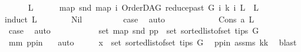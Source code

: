 \begin{isabellebody}
\ \ \ \ \isamarkupfalse%
\ L\isanewline
\ \ \ \ \isamarkupfalse%
\ {\isachardoublequoteopen}map\ snd\ {\isacharparenleft}{\kern0pt}map\ {\isacharparenleft}{\kern0pt}{\isasymlambda}i{\isachardot}{\kern0pt}\ {\isacharparenleft}{\kern0pt}OrderDAG\ {\isacharparenleft}{\kern0pt}reduce{\isacharunderscore}{\kern0pt}past\ G\ i{\isacharparenright}{\kern0pt}\ k{\isacharcomma}{\kern0pt}\ i{\isacharparenright}{\kern0pt}{\isacharparenright}{\kern0pt}\ L{\isacharparenright}{\kern0pt}\ {\isacharequal}{\kern0pt}\ L{\isachardoublequoteclose}\isanewline
\ \ \ \ \isamarkupfalse%
{\isacharparenleft}{\kern0pt}induct\ L{\isacharparenright}{\kern0pt}\isanewline
\ \ \ \ \ \ \isamarkupfalse%
\ Nil\isanewline
\ \ \ \ \ \ \isamarkupfalse%
\ \isamarkupfalse%
\ {\isacharquery}{\kern0pt}case\ \isamarkupfalse%
\ auto\isanewline
\ \ \ \ \isamarkupfalse%
\isanewline
\ \ \ \ \ \ \isamarkupfalse%
\ {\isacharparenleft}{\kern0pt}Cons\ a\ L{\isacharparenright}{\kern0pt}\isanewline
\ \ \ \ \ \ \isamarkupfalse%
\ \isamarkupfalse%
\ {\isacharquery}{\kern0pt}case\ \isamarkupfalse%
\ auto\isanewline
\ \ \ \ \isamarkupfalse%
\isanewline
\ \ \isamarkupfalse%
\isanewline
\ \ \isamarkupfalse%
\ {\isachardoublequoteopen}set\ {\isacharparenleft}{\kern0pt}map\ snd\ pp{\isacharparenright}{\kern0pt}\ {\isacharequal}{\kern0pt}\ set\ {\isacharparenleft}{\kern0pt}sorted{\isacharunderscore}{\kern0pt}list{\isacharunderscore}{\kern0pt}of{\isacharunderscore}{\kern0pt}set\ {\isacharparenleft}{\kern0pt}tips\ G{\isacharparenright}{\kern0pt}{\isacharparenright}{\kern0pt}{\isachardoublequoteclose}\ \isanewline
\ \ \ \ \isamarkupfalse%
\ mm{}\ pp{\isacharunderscore}{\kern0pt}in\ \ \isamarkupfalse%
\ auto\isanewline
\ \ \isamarkupfalse%
\ \isamarkupfalse%
\ {\isachardoublequoteopen}x\ {\isasymin}\ set\ {\isacharparenleft}{\kern0pt}sorted{\isacharunderscore}{\kern0pt}list{\isacharunderscore}{\kern0pt}of{\isacharunderscore}{\kern0pt}set\ {\isacharparenleft}{\kern0pt}tips\ G{\isacharparenright}{\kern0pt}{\isacharparenright}{\kern0pt}{\isachardoublequoteclose}\ \isamarkupfalse%
\ pp{\isacharunderscore}{\kern0pt}in\ assms{\isacharparenleft}{\kern0pt}{}{\isacharparenright}{\kern0pt}\ kk\ \isamarkupfalse%
\ blast\ \isanewline
\ \ \isamarkupfalse%

\end{isabellebody}
